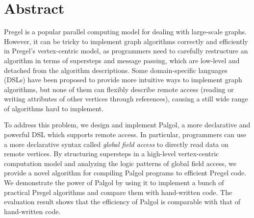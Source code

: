 \chapter*{Abstract}

Pregel is a popular parallel computing model for dealing with large-scale graphs.
However, it can be tricky to implement graph algorithms correctly and efficiently in Pregel's vertex-centric model, as programmers need to carefully restructure an algorithm in terms of supersteps and message passing, which are low-level and detached from the algorithm descriptions.
Some domain-specific languages (DSLs) have been proposed to provide more intuitive ways to implement graph algorithms, but none of them can flexibly describe remote access (reading or writing attributes of other vertices through references), causing a still wide range of algorithms hard to implement.

To address this problem, we design and implement Palgol, a more declarative and powerful DSL which supports remote access.
In particular, programmers can use a more declarative syntax called \emph{global field access} to directly read data on remote vertices.
By structuring supersteps in a high-level vertex-centric computation model and analyzing the logic patterns of global field access, we provide a novel algorithm for compiling Palgol programs to efficient Pregel code.
We demonstrate the power of Palgol by using it to implement a bunch of practical Pregel algorithms and compare them with hand-written code.
The evaluation result shows that the efficiency of Palgol is comparable with that of hand-written code.
